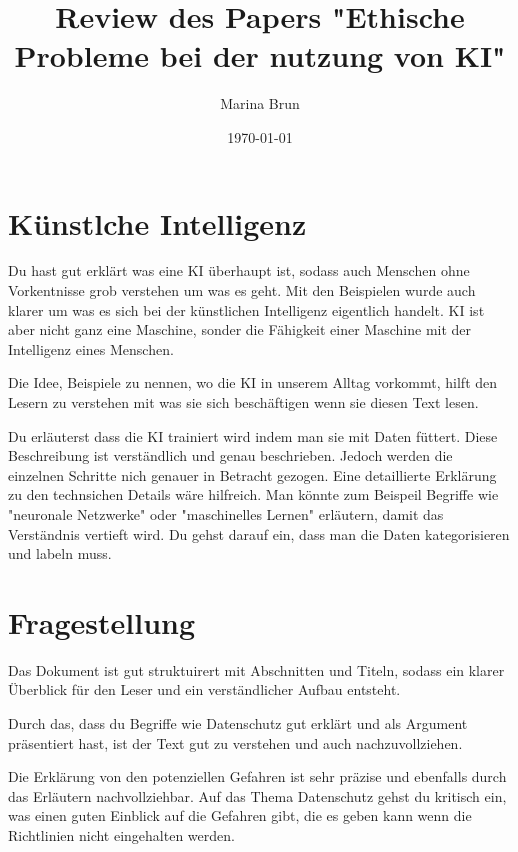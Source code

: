 \documentclass{article}
\title{Review des Papers "Ethische Probleme bei der nutzung von KI" }
\author{Marina Brun}
\date{\today}
\begin{document}
\maketitle







\section{Künstlche Intelligenz}

Du hast gut erklärt was eine KI überhaupt ist, sodass auch Menschen ohne Vorkentnisse grob verstehen um was es geht. Mit den Beispielen wurde auch klarer um was es sich bei der künstlichen Intelligenz eigentlich handelt. KI ist aber nicht ganz eine Maschine, sonder die Fähigkeit einer Maschine mit der Intelligenz eines Menschen. 

\vspace{2mm} Die Idee, Beispiele zu nennen, wo die KI in unserem Alltag vorkommt, hilft den Lesern zu verstehen mit was sie sich beschäftigen wenn sie diesen Text lesen. 

\vspace{2mm} Du erläuterst dass die KI trainiert wird indem man sie mit Daten füttert. Diese Beschreibung ist verständlich und genau beschrieben. Jedoch werden die einzelnen Schritte nich genauer in Betracht gezogen. Eine detaillierte Erklärung zu den technsichen Details wäre hilfreich. Man könnte zum Beispeil Begriffe wie "neuronale Netzwerke" oder "maschinelles Lernen" erläutern, damit das Verständnis vertieft wird. Du gehst darauf ein, dass man die Daten kategorisieren und labeln muss.


\section{Fragestellung}

Das Dokument ist gut struktuirert mit Abschnitten und Titeln, sodass ein klarer Überblick für den Leser und ein verständlicher Aufbau entsteht.

\vspace{2mm} Durch das, dass du Begriffe wie Datenschutz gut erklärt und als Argument präsentiert hast, ist der Text gut zu verstehen und auch nachzuvollziehen.

\vspace{2mm} Die Erklärung von den potenziellen Gefahren ist sehr präzise und ebenfalls durch das Erläutern nachvollziehbar. Auf das Thema Datenschutz gehst du kritisch ein, was einen guten Einblick auf die Gefahren gibt, die es geben kann wenn die Richtlinien nicht eingehalten werden. 
\end{document}
